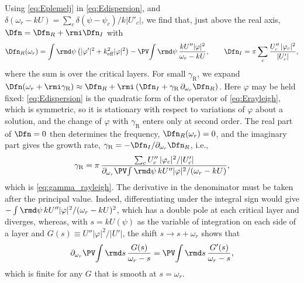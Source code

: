 Using \cref{eq:Eplemelj} in \cref{eq:Edispersion}, and \(\delta(\omega_r - kU) = \sum_c\delta(\psi - \psi_c)/k|U'_c|\), we find that, just above the real axis, \(\Dfn = \Dfn_R + \rmi\Dfn_I\) with
\begin{equation}
\Dfn_R(\omega_r) = \int\rmd\psi\left(|\varphi'|^2 + k_\text{eff}^2|\varphi|^2\right) - \PV\!\int\rmd\psi\,\frac{kU''|\varphi|^2}{\omega_r - kU},
\qquad
\Dfn_I = \pi\sum_c\frac{U''_c\,|\varphi_c|^2}{|U'_c|},
\label{eq:Eparts}
\end{equation}
where the sum is over the critical layers. For small \(\gamma_\text{R}\), we expand \(\Dfn(\omega_r + \rmi\gamma_\text{R})\approx\Dfn_R + \rmi\,(\Dfn_I + \gamma_\text{R}\,\partial_{\omega_r}\Dfn_R)\). Here \(\varphi\) may be held fixed: \cref{eq:Edispersion} is the quadratic form of the operator of \cref{eq:Erayleigh}, which is symmetric, so it is stationary with respect to variations of \(\varphi\) about a solution, and the change of \(\varphi\) with \(\gamma_\text{R}\) enters only at second order. The real part of \(\Dfn = 0\) then determines the frequency, \(\Dfn_R(\omega_r) = 0\), and the imaginary part gives the growth rate, \(\gamma_\text{R} = -\Dfn_I/\partial_{\omega_r}\Dfn_R\), i.e.,
\begin{equation}
\gamma_\text{R} = \pi\,\frac{\sum_c U''_c\,|\varphi_c|^2/|U'_c|}{\partial_{\omega_r}\PV\!\int\rmd\psi\,kU''|\varphi|^2/(\omega_r - kU)},
\label{eq:Egrowth}
\end{equation}
which is \cref{eq:gamma_rayleigh}. The derivative in the denominator must be taken after the principal value. Indeed, differentiating under the integral sign would give \(-\int\rmd\psi\,kU''|\varphi|^2/(\omega_r - kU)^2\), which has a double pole at each critical layer and diverges, whereas, with \(s = kU(\psi)\) as the variable of integration on each side of a layer and \(G(s)\equiv U''|\varphi|^2/|U'|\), the shift \(s\to s + \omega_r\) shows that
\begin{equation}
\partial_{\omega_r}\PV\!\int\rmd s\,\frac{G(s)}{\omega_r - s} = \PV\!\int\rmd s\,\frac{G'(s)}{\omega_r - s},
\label{eq:Ederivative}
\end{equation}
which is finite for any \(G\) that is smooth at \(s = \omega_r\).

